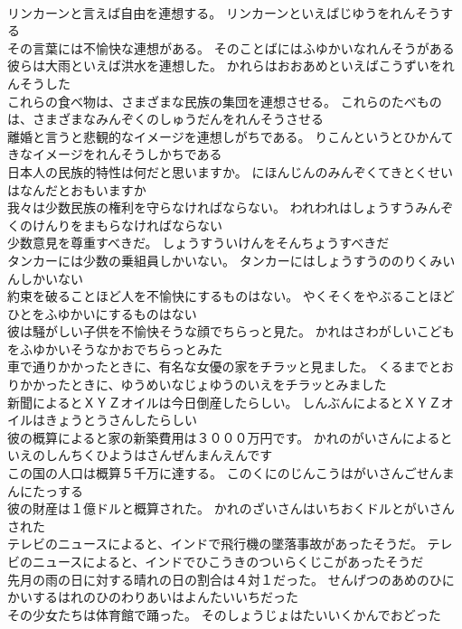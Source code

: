 \documentclass[8pt]{extreport}
\begin{document}
\begin{CJK}{UTF8}{min}
\\	リンカーンと言えば自由を連想する。	リンカーンといえばじゆうをれんそうする 
\\	その言葉には不愉快な連想がある。	そのことばにはふゆかいなれんそうがある 
\\	彼らは大雨といえば洪水を連想した。	かれらはおおあめといえばこうずいをれんそうした 
\\	これらの食べ物は、さまざまな民族の集団を連想させる。	これらのたべものは、さまざまなみんぞくのしゅうだんをれんそうさせる 
\\	離婚と言うと悲観的なイメージを連想しがちである。	りこんというとひかんてきなイメージをれんそうしかちである 
\\	日本人の民族的特性は何だと思いますか。	にほんじんのみんぞくてきとくせいはなんだとおもいますか 
\\	我々は少数民族の権利を守らなければならない。	われわれはしょうすうみんぞくのけんりをまもらなければならない 
\\	少数意見を尊重すべきだ。	しょうすういけんをそんちょうすべきだ 
\\	タンカーには少数の乗組員しかいない。	タンカーにはしょうすうののりくみいんしかいない 
\\	約束を破ることほど人を不愉快にするものはない。	やくそくをやぶることほどひとをふゆかいにするものはない 
\\	彼は騒がしい子供を不愉快そうな顔でちらっと見た。	かれはさわがしいこどもをふゆかいそうなかおでちらっとみた 
\\	車で通りかかったときに、有名な女優の家をチラッと見ました。	くるまでとおりかかったときに、ゆうめいなじょゆうのいえをチラッとみました 
\\	新聞によるとＸＹＺオイルは今日倒産したらしい。	しんぶんによるとＸＹＺオイルはきょうとうさんしたらしい 
\\	彼の概算によると家の新築費用は３０００万円です。	かれのがいさんによるといえのしんちくひようはさんぜんまんえんです 
\\	この国の人口は概算５千万に達する。	このくにのじんこうはがいさんごせんまんにたっする 
\\	彼の財産は１億ドルと概算された。	かれのざいさんはいちおくドルとがいさんされた 
\\	テレビのニュースによると、インドで飛行機の墜落事故があったそうだ。	テレビのニュースによると、インドでひこうきのついらくじこがあったそうだ 
\\	先月の雨の日に対する晴れの日の割合は４対１だった。	せんげつのあめのひにかいするはれのひのわりあいはよんたいいちだった 
\\	その少女たちは体育館で踊った。	そのしょうじょはたいいくかんでおどった 

\end{CJK}
\end{document}
